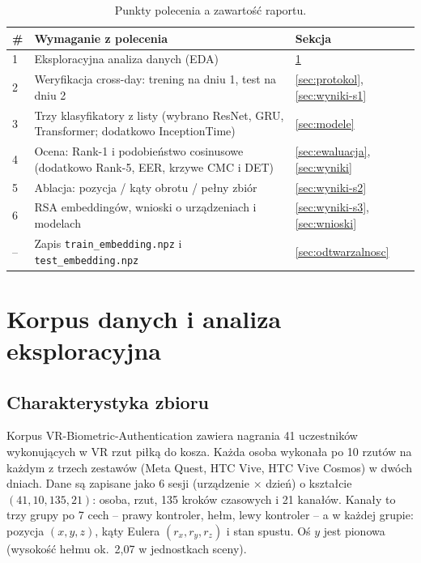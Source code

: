\documentclass[11pt,a4paper]{article}
\newcommand{\code}[1]{\texttt{#1}}
\begin{document}
\begin{table}[H]
\centering\small
\caption{Punkty polecenia a zawartość raportu.}
\label{tab:mapa}
\begin{tabularx}{\linewidth}{@{}lXl@{}}
\toprule
\# & Wymaganie z polecenia & Sekcja \\
\midrule
1 & Eksploracyjna analiza danych (EDA) & \ref{sec:eda} \\
2 & Weryfikacja cross-day: trening na dniu 1, test na dniu 2 & \ref{sec:protokol}, \ref{sec:wyniki-s1} \\
3 & Trzy klasyfikatory z listy (wybrano ResNet, GRU, Transformer; dodatkowo InceptionTime) & \ref{sec:modele} \\
4 & Ocena: Rank-1 i podobieństwo cosinusowe (dodatkowo Rank-5, EER, krzywe CMC i DET) & \ref{sec:ewaluacja}, \ref{sec:wyniki} \\
5 & Ablacja: pozycja / kąty obrotu / pełny zbiór & \ref{sec:wyniki-s2} \\
6 & RSA embeddingów, wnioski o urządzeniach i modelach & \ref{sec:wyniki-s3}, \ref{sec:wnioski} \\
-- & Zapis \code{train\_embedding.npz} i \code{test\_embedding.npz} & \ref{sec:odtwarzalnosc} \\
\bottomrule
\end{tabularx}
\end{table}

\section{Korpus danych i analiza eksploracyjna}\label{sec:eda}
\subsection{Charakterystyka zbioru}
Korpus VR-Biometric-Authentication \cite{dataset} zawiera nagrania 41 uczestników wykonujących
w VR rzut piłką do kosza. Każda osoba wykonała
po 10 rzutów na każdym z trzech zestawów (Meta Quest, HTC Vive, HTC Vive Cosmos) w dwóch dniach. Dane
są zapisane jako 6 sesji (urządzenie $\times$ dzień) o kształcie $(41, 10, 135, 21)$: osoba, rzut,
135 kroków czasowych i 21 kanałów. Kanały to trzy grupy po 7 cech -- prawy kontroler, hełm, lewy
kontroler -- a w każdej grupie: pozycja $(x, y, z)$, kąty Eulera $(r_x, r_y, r_z)$ i stan spustu.
Oś $y$ jest pionowa (wysokość hełmu ok.~2{,}07 w jednostkach sceny).
\end{document}
